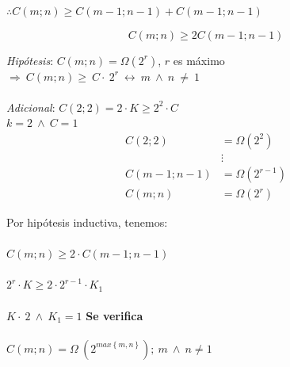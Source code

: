 \documentclass[conference]{IEEEtran}
\begin{document}
$\therefore C\left(m;n\right)\ge C\left(m-1;n-1\right)+C\left(m-1;n-1\right)$

\[
 \boxed{C\left(m;n\right)\ge 2C\left(m-1;n-1\right)}
 \]

\textit{Hipótesis}: $C\left(m;n\right)=\Omega \left(2^r\right)$, $r$ es máximo\\
$\Rightarrow \:C\left(m;n\right)\ge \:C\cdot \:2^r\:\leftrightarrow \:m\:\wedge \:n\:\ne \:1$\\\\

\textit{Adicional}:
$C\left(2;2\right)=2\cdot K\ge 2^2\cdot C$\\
$k=2\:\wedge \:C=1$\\

\begin{align*}
   C\left(2;2\right)&=\Omega \left(2^2\right) \\
   &\vdots\\
   C\left(m-1;n-1\right)&=\Omega \left(2^{r-1}\right)\\
   C\left(m;n\right)&=\Omega \left(2^r\right)
\end{align*}

Por hipótesis inductiva, tenemos:\\\\
$C\left(m;n\right)\ge 2\cdot C\left(m-1;n-1\right)$\\\\
$2^r\cdot K\ge 2\cdot 2^{r-1}\cdot K_1$\\\\
$K\cdot \:2\:\wedge \:K_1=1$ \textbf{Se verifica}\\\\
$C\left(m;n\right)=\Omega \:\left(2^{max\left\{m,n\right\}}\right);\:m\:\wedge \:n \neq 1$
\end{document}

